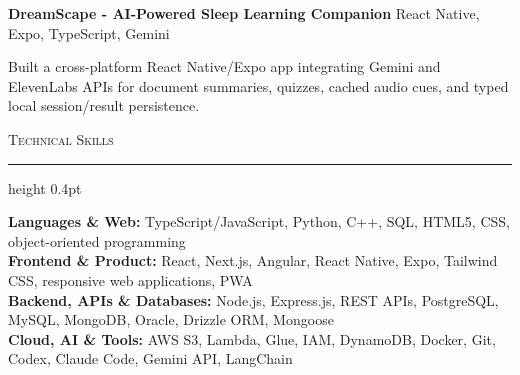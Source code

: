 \documentclass[letterpaper,11pt]{article}
\newcommand{\resumesection}[1]{%
  \par\vspace{2pt}%
  {\large\scshape #1}\par\vspace{2pt}%
  \hrule height 0.4pt\vspace{2pt}%
}
\newcommand{\projectHeading}[2]{
  \textbf{#1} \hfill #2
}
\begin{document}
\projectHeading{DreamScape - AI-Powered Sleep Learning Companion}{React Native, Expo, TypeScript, Gemini}
\begin{tightitemize}
  \item Built a cross-platform React Native/Expo app integrating Gemini and ElevenLabs APIs for document summaries, quizzes, cached audio cues, and typed local session/result persistence.
\end{tightitemize}

\resumesection{Technical Skills}
\textbf{Languages \& Web:} TypeScript/JavaScript, Python, C++, SQL, HTML5, CSS, object-oriented programming\\
\textbf{Frontend \& Product:} React, Next.js, Angular, React Native, Expo, Tailwind CSS, responsive web applications, PWA\\
\textbf{Backend, APIs \& Databases:} Node.js, Express.js, REST APIs, PostgreSQL, MySQL, MongoDB, Oracle, Drizzle ORM, Mongoose\\
\textbf{Cloud, AI \& Tools:} AWS S3, Lambda, Glue, IAM, DynamoDB, Docker, Git, Codex, Claude Code, Gemini API, LangChain
\end{document}
